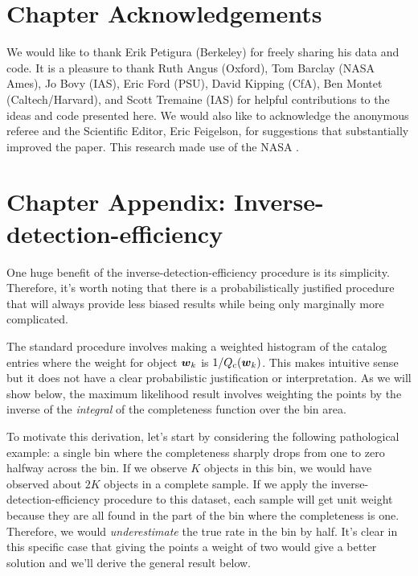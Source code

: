 \section{Chapter Acknowledgements}

We would like to thank Erik Petigura (Berkeley) for freely sharing his data
and code.
It is a pleasure to thank
Ruth Angus (Oxford),
Tom Barclay (NASA Ames),
Jo Bovy (IAS),
Eric Ford (PSU),
David Kipping (CfA),
Ben Montet (Caltech/Harvard), and
Scott Tremaine (IAS)
for helpful contributions to the ideas and code presented here.
We would also like to acknowledge the anonymous referee and the Scientific
Editor, Eric Feigelson, for suggestions that
substantially improved the paper.
This research made use of the NASA .

\section{Chapter Appendix: Inverse-detection-efficiency}

One huge benefit of the inverse-detection-efficiency procedure is its
simplicity.
Therefore, it's worth noting that there is a probabilistically justified
procedure that will always provide less biased results while being only
marginally more complicated.

The standard procedure involves making a weighted histogram of the catalog
entries where the weight for object ${\boldsymbol{w}}_k$ is $1/{Q_\mathrm{c}}({\boldsymbol{w}}_k)$.
This makes intuitive sense but it does not have a clear probabilistic
justification or interpretation.
As we will show below, the maximum likelihood result involves weighting the
points by the inverse of the \emph{integral} of the completeness function over
the bin area.

To motivate this derivation, let's start by considering the following
pathological example: a single bin where the completeness sharply drops from
one to zero halfway across the bin.
If we observe $K$ objects in this bin, we would have observed about $2K$
objects in a complete sample.
If we apply the inverse-detection-efficiency procedure to this dataset, each
sample will get unit weight because they are all found in the part of the bin
where the completeness is one.
Therefore, we would \emph{underestimate} the true rate in the bin by half.
It's clear in this specific case that giving the points a weight of two would
give a better solution and we'll derive the general result below.

